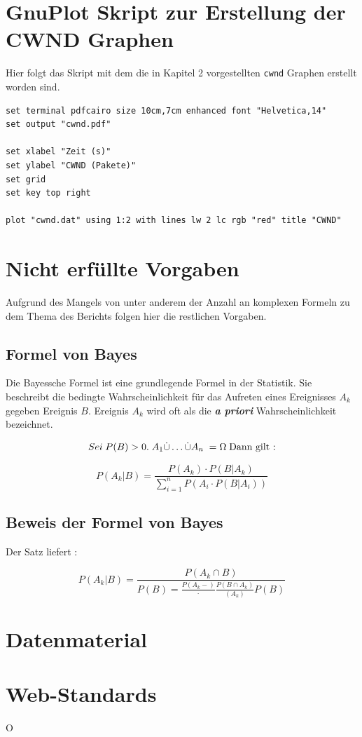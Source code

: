 \documentclass[paper=a4,fontsize=12pt,ngerman]{scrartcl}
\begin{document}
\section{GnuPlot Skript zur Erstellung der CWND Graphen}
Hier folgt das Skript mit dem die in Kapitel 2 vorgestellten \texttt{cwnd} Graphen erstellt worden sind.

\begin{verbatim}
set terminal pdfcairo size 10cm,7cm enhanced font "Helvetica,14"
set output "cwnd.pdf"

set xlabel "Zeit (s)"
set ylabel "CWND (Pakete)"
set grid
set key top right

plot "cwnd.dat" using 1:2 with lines lw 2 lc rgb "red" title "CWND"
\end{verbatim}


\section{Nicht erfüllte Vorgaben}
Aufgrund des Mangels von unter anderem der Anzahl an komplexen Formeln zu dem Thema des Berichts folgen hier die 
restlichen Vorgaben.

\subsection{Formel von Bayes}
Die Bayessche Formel ist eine grundlegende Formel in der Statistik. Sie beschreibt die bedingte Wahrscheinlichkeit für
das Aufreten eines Ereignisses $A_k$ gegeben Ereignis $B$. 
Ereignis $A_k$ wird oft als die \textbf{\textit{a priori}} Wahrscheinlichkeit bezeichnet.

\[
Sei \; P(B)>0. \; A_1 \dot{\cup} \ldots \dot{\cup} A_n \;  =\Omega \; \text{Dann gilt :} \newline
\]

\[
P(A_k | B) = \frac{P(A_k)  \cdot P(B | A_k)}{\sum_{i=1}^{n}P(A_i  \cdot P(B | A_i))}
\]

\subsection{Beweis der Formel von Bayes}

Der Satz liefert : \newline

\[
P(A_k | B) = \frac{P(A_k \cap B)}{P(B) = \frac{P(A_k-)} \cdot \frac{P(B \cap A_k)}{(A_k)}{P(B)}}
\]





\section{Datenmaterial}


\section{Web-Standards}
O
\end{document}
